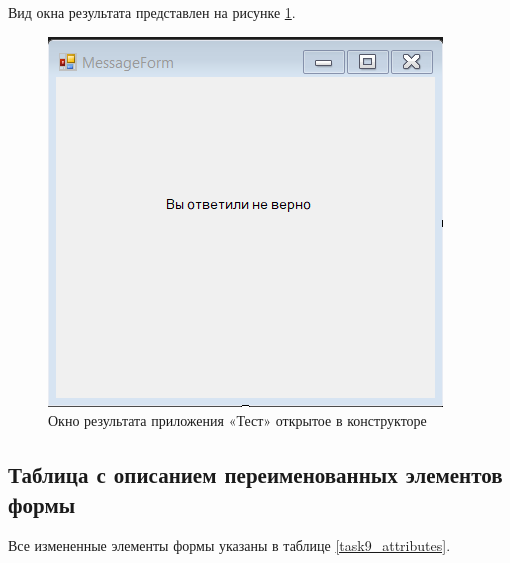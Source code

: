 Вид окна результата представлен на рисунке \ref{task9_form2}.
\begin{figure}[H]
    \centering
    \includegraphics[width=0.5\linewidth]{lections/img/task9_form2.png}
    \caption{Окно результата приложения «Тест» открытое в конструкторе}
    \label{task9_form2}
\end{figure}


\subsection{Таблица с описанием переименованных элементов формы}
Все измененные элементы формы указаны в таблице \ref{task9_attributes}.

